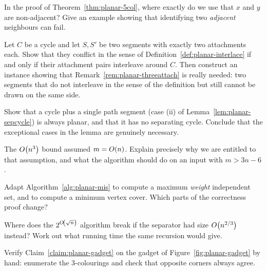 \begin{exercise}
In the proof of Theorem~\ref{thm:planar-5col}, where exactly do we use that $x$ and
$y$ are non-adjacent? Give an example showing that identifying two
\emph{adjacent} neighbours can fail.
\end{exercise}

\begin{exercise}
Let $C$ be a cycle and let $S, S'$ be two segments with exactly two attachments
each. Show that they conflict in the sense of
Definition~\ref{def:planar-interlace} if and only if their attachment pairs
interleave around $C$. Then construct an instance showing that
Remark~\ref{rem:planar-threeattach} is really needed: two segments that do not
interleave in the sense of the definition but still cannot be drawn on the same
side.
\end{exercise}

\begin{exercise}
Show that a cycle plus a single path segment (case (ii) of
Lemma~\ref{lem:planar-sepcycle}) is always planar, and that it has no separating
cycle. Conclude that the exceptional cases in the lemma are genuinely
necessary.
\end{exercise}

\begin{exercise}
The $O\!\left(n^3\right)$ bound assumed $m = O\!\left(n\right)$. Explain precisely why we are
entitled to that assumption, and what the algorithm should do on an input with
$m > 3n-6$.
\end{exercise}

\begin{exercise}
Adapt Algorithm~\ref{alg:planar-mis} to compute a maximum \emph{weight} independent
set, and to compute a minimum vertex cover. Which parts of the correctness
proof change?
\end{exercise}

\begin{exercise}
Where does the $2^{O\!\left(\sqrt n\right)}$ algorithm break if the separator had size
$O\!\left(n^{2/3}\right)$ instead? Work out what running time the same recursion would
give.
\end{exercise}

\begin{exercise}
Verify Claim~\ref{claim:planar-gadget} on the gadget of Figure~\ref{fig:planar-gadget} by
hand: enumerate the $3$-colourings and check that opposite corners always
agree.
\end{exercise}


